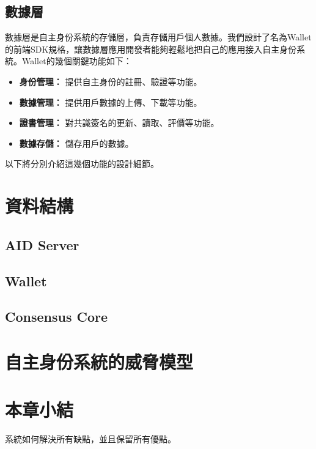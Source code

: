 \subsection{數據層}
數據層是自主身份系統的存儲層，負責存儲用戶個人數據。我們設計了名為Wallet的前端SDK規格，讓數據層應用開發者能夠輕鬆地把自己的應用接入自主身份系統。Wallet的幾個關鍵功能如下：
\begin{itemize}
  \item \textbf{身份管理：} 提供自主身份的註冊、驗證等功能。
  \item \textbf{數據管理：} 提供用戶數據的上傳、下載等功能。
  \item \textbf{證書管理：} 對共識簽名的更新、讀取、評價等功能。
  \item \textbf{數據存儲：} 儲存用戶的數據。
\end{itemize}
以下將分別介紹這幾個功能的設計細節。
\section{資料結構}
\subsection{AID Server}
\subsection{Wallet}
\subsection{Consensus Core}
\section{自主身份系統的威脅模型}
\section{本章小結}
系統如何解決所有缺點，並且保留所有優點。
